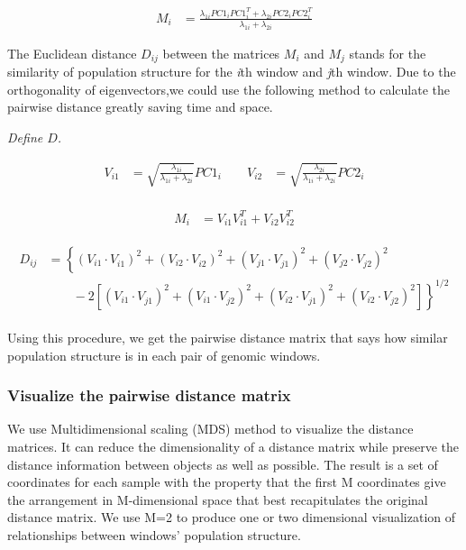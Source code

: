 \documentclass[11pt, oneside]{article}   	%
\newcommand{\plr}[1]{{\em \color{blue} #1}}
\begin{document}
\begin{align}
    M_{i} &= \frac{\lambda_{1i}PC1_{i}PC1_{i}^{T}+\lambda_{2i}PC2_{i}PC2_{i}^{T}}{\lambda_{1i}+\lambda_{2i}} 
\end{align}

The Euclidean distance $D_{ij}$ between the matrices $M_i$ and $M_j$ stands for the similarity of population structure for the \textit{i}th window and \textit{j}th window. 
Due to the orthogonality of eigenvectors,we could use the following method to calculate the pairwise distance greatly saving time and space.

\plr{Define $D$.}

\begin{equation}
    \begin{aligned}
        V_{i1}&=\sqrt{\frac{\lambda _{1i}}{\lambda _{1i}+\lambda _{2i}}}PC1_{i} \qquad
        V_{i2}&=\sqrt{\frac{\lambda _{2i}}{\lambda _{1i}+\lambda _{2i}}}PC2_{i} \\
    \end{aligned}
\end{equation}

\begin{align}
    M_{i} &= V_{i1}V_{i1}^{T}+V_{i2}V_{i2}^{T}
\end{align}


\begin{align}
    \begin{split}
    D_{ij} &= 
        \left \{
                \left ( 
                    V_{i1}\cdot V_{i1}^{} 
                \right )^{2}
                + \left ( V_{i2}\cdot V_{i2}^{} \right )^{2}
                + \left ( V_{j1}\cdot V_{j1}^{} \right )^{2} 
                +\left ( V_{j2}\cdot V_{j2}^{} \right )^{2} 
        \right. \\ 
        & \left. \qquad {}  
            -2\left [ 
                \left ( V_{i1}\cdot V_{j1}^{} \right )^{2}
                + \left ( V_{i1}\cdot V_{j2}^{} \right )^{2}
                + \left ( V_{i2}\cdot V_{j1}^{} \right )^{2} 
                + \left ( V_{i2}\cdot V_{j2}^{} \right )^{2}
            \right ]
        \right \}^{1/2}
    \end{split}
\end{align}

Using this procedure, 
we get the pairwise distance matrix that says how similar population structure is 
in each pair of genomic windows.

\subsubsection{Visualize the pairwise distance matrix}
We use Multidimensional scaling (MDS) method to visualize the distance matrices. 
It can reduce the dimensionality of a distance matrix while preserve the distance information between objects as well as possible. 
The result is a set of coordinates for each sample with the property that 
the first M coordinates give the arrangement in M-dimensional space that best recapitulates the original distance matrix.
We use M=2 to produce one or two dimensional visualization of relationships between windows' population structure.
\end{document}

